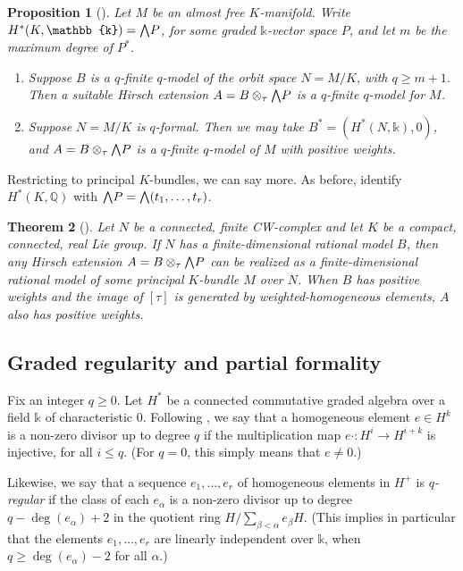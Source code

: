 \documentclass{article}
\numberwithin{equation}{section}
\newtheorem{theorem}{Theorem}[section]
\newtheorem{proposition}[theorem]{Proposition}
\theoremstyle{definition}
\newcommand{\Q}{\mathbb{Q}}
\renewcommand{\k}{\mathbb{k}}
\newcommand{\bwedge}{\mbox{\normalsize $\bigwedge$}}
\begin{document}
\begin{proposition}[\cite{PS-imrn19}]
\label{prop:newfinite}
Let $M$ be an almost free $K$-manifold. Write 
$H^{*}(K,\k)=\bwedge P$, for some graded $\k$-vector 
space $P$, and let $m$ be the maximum 
degree of $P^*$.
\begin{enumerate}
\item \label{nf1}
Suppose $B$ is a $q$-finite $q$-model of the orbit space $N=M/K$, 
with $q\ge m+1$.  Then a suitable Hirsch extension
$A=B\otimes_{\tau} \bwedge P$ is  a $q$-finite $q$-model for $M$. 
\item \label{nf2}
Suppose $N=M/K$ is $q$-formal.  Then we may take 
$B^{*}=(H^{*}(N,\k), 0)$, and $A=B\otimes_{\tau} \bwedge P$  
is  a $q$-finite $q$-model of $M$ with positive weights.
\end{enumerate}
\end{proposition}

Restricting to principal $K$-bundles, we can say more. 
As before, identify $H^{*}(K, \Q)$ with $\bwedge P= \bwedge (t_1,\dots,t_r)$.

\begin{theorem}[\cite{PS-imrn19}]
\label{thm:krealiz}
Let $N$ be a connected, finite CW-complex and let $K$ be a compact, connected, 
real Lie group. If $N$ has a finite-dimensional 
rational model $B$, then any Hirsch extension 
$A=B\otimes_{\tau} \bwedge P$ can be realized as a finite-dimensional 
rational model of some principal $K$-bundle $M$ over $N$. When $B$ 
has positive weights and the image of $[\tau]$ is generated by 
weighted-homogeneous elements, $A$ also has positive weights. 
\end{theorem}

\subsection{Graded regularity and partial formality}
\label{subsec:partform-circle}

Fix an integer $q\ge 0$.   
Let $H^{*}$ be a connected commutative graded algebra over a 
field $\k$ of characteristic $0$. Following \cite{PS-imrn19}, we 
say that a homogeneous element $e\in H^k$ is a non-zero divisor 
up to degree $q$ if the multiplication map $e \cdot \colon H^i \to H^{i+k}$ 
is injective, for all $i\le q$.  (For $q=0$, this simply means that $e\ne 0$.) 

Likewise, we say that a sequence $e_1,\dots ,e_r$
of  homogeneous elements in $H^+$ is {\em $q$-regular}\/ 
if the class of each $e_{\alpha}$ is a non-zero divisor up to 
degree $q-\deg(e_{\alpha})+2$ in the quotient ring $H/\sum_{\beta <\alpha} e_{\beta} H$.
(This implies in particular that the elements  $e_1,\dots ,e_r$ are 
linearly independent over $\k$, when  $q\ge \deg(e_{\alpha})-2$ for all $\alpha$.)
\end{document}
